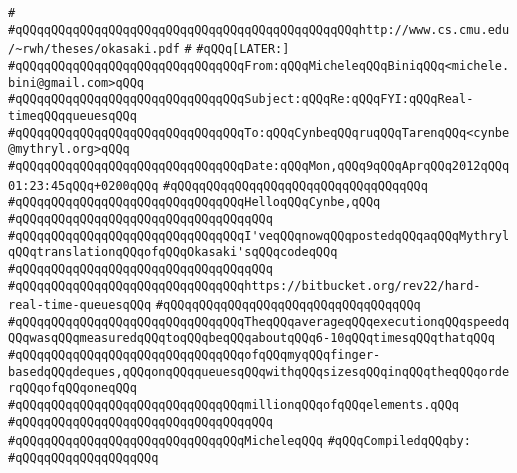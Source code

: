 \verb|#|\newline
\verb|#qQQqqQQqqQQqqQQqqQQqqQQqqQQqqQQqqQQqqQQqqQQqqQQqhttp://www.cs.cmu.edu/~rwh/theses/okasaki.pdf|\newline
\verb|#|\newline
\verb|#qQQq[LATER:]|\newline
\verb|#qQQqqQQqqQQqqQQqqQQqqQQqqQQqqQQqFrom:qQQqMicheleqQQqBiniqQQq<michele.bini@gmail.com>qQQq|\newline
\verb|#qQQqqQQqqQQqqQQqqQQqqQQqqQQqqQQqSubject:qQQqRe:qQQqFYI:qQQqReal-timeqQQqqueuesqQQq|\newline
\verb|#qQQqqQQqqQQqqQQqqQQqqQQqqQQqqQQqTo:qQQqCynbeqQQqruqQQqTarenqQQq<cynbe@mythryl.org>qQQq|\newline
\verb|#qQQqqQQqqQQqqQQqqQQqqQQqqQQqqQQqDate:qQQqMon,qQQq9qQQqAprqQQq2012qQQq01:23:45qQQq+0200qQQq|\newline
\verb|#qQQqqQQqqQQqqQQqqQQqqQQqqQQqqQQqqQQq|\newline
\verb|#qQQqqQQqqQQqqQQqqQQqqQQqqQQqqQQqHelloqQQqCynbe,qQQq|\newline
\verb|#qQQqqQQqqQQqqQQqqQQqqQQqqQQqqQQqqQQq|\newline
\verb|#qQQqqQQqqQQqqQQqqQQqqQQqqQQqqQQqI'veqQQqnowqQQqpostedqQQqaqQQqMythrylqQQqtranslationqQQqofqQQqOkasaki'sqQQqcodeqQQq|\newline
\verb|#qQQqqQQqqQQqqQQqqQQqqQQqqQQqqQQqqQQq|\newline
\verb|#qQQqqQQqqQQqqQQqqQQqqQQqqQQqqQQqhttps://bitbucket.org/rev22/hard-real-time-queuesqQQq|\newline
\verb|#qQQqqQQqqQQqqQQqqQQqqQQqqQQqqQQqqQQq|\newline
\verb|#qQQqqQQqqQQqqQQqqQQqqQQqqQQqqQQqTheqQQqaverageqQQqexecutionqQQqspeedqQQqwasqQQqmeasuredqQQqtoqQQqbeqQQqaboutqQQq6-10qQQqtimesqQQqthatqQQq|\newline
\verb|#qQQqqQQqqQQqqQQqqQQqqQQqqQQqqQQqofqQQqmyqQQqfinger-basedqQQqdeques,qQQqonqQQqqueuesqQQqwithqQQqsizesqQQqinqQQqtheqQQqorderqQQqofqQQqoneqQQq|\newline
\verb|#qQQqqQQqqQQqqQQqqQQqqQQqqQQqqQQqmillionqQQqofqQQqelements.qQQq|\newline
\verb|#qQQqqQQqqQQqqQQqqQQqqQQqqQQqqQQqqQQq|\newline
\verb|#qQQqqQQqqQQqqQQqqQQqqQQqqQQqqQQqMicheleqQQq|\newline
\newline
\verb|#qQQqCompiledqQQqby:|\newline
\verb|#qQQqqQQqqQQqqQQqqQQq|\newline
